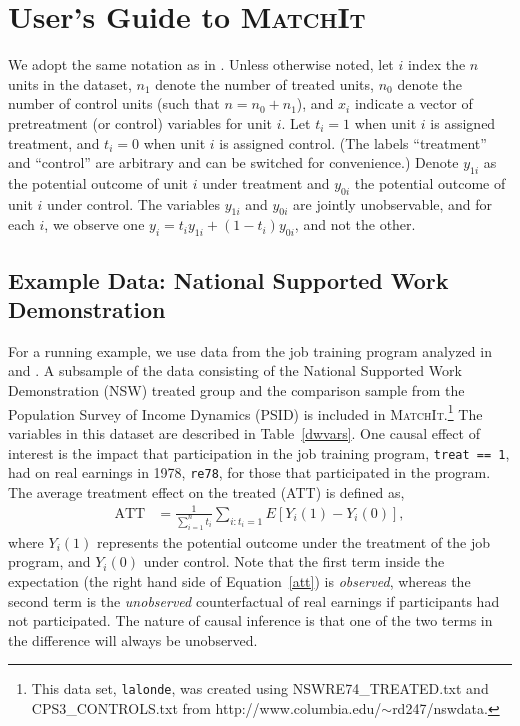 \documentclass[oneside,letterpaper,titlepage]{article}
\newcommand{\MatchIt}{\textsc{MatchIt}}
\begin{document}
\section{User's Guide to \MatchIt}
\label{methods}

We adopt the same notation as in \citet*{HoImaKin05}. Unless otherwise
noted, let $i$ index the $n$ units in the dataset, $n_1$ denote the
number of treated units, $n_0$ denote the number of control units
(such that $n=n_0+n_1$), and $x_i$ indicate a vector of pretreatment
(or control) variables for unit $i$.  Let $t_i=1$ when unit $i$ is
assigned treatment, and $t_i=0$ when unit $i$ is assigned control.
(The labels ``treatment'' and ``control'' are arbitrary and can be
switched for convenience.)  Denote $y_{1i}$ as the potential outcome
of unit $i$ under treatment and $y_{0i}$ the potential outcome of unit
$i$ under control.  The variables $y_{1i}$ and $y_{0i}$ are jointly
unobservable, and for each $i$, we observe one
$y_i=t_iy_{1i}+(1-t_i)y_{0i}$, and not the other.


\subsection{Example Data: National Supported Work Demonstration}
\label{subsec:lalonde}

For a running example, we use data from the job training program
analyzed in \citet{lalonde86} and \citet{DehWah99}.  A subsample of
the data consisting of the National Supported Work Demonstration (NSW)
treated group and the comparison sample from the Population Survey of
Income Dynamics (PSID) is included in \MatchIt.\footnote{This data set, \texttt{lalonde},
was created using NSWRE74_TREATED.txt and CPS3_CONTROLS.txt from
http://www.columbia.edu/$\sim$rd247/nswdata.}  The variables in this
dataset are described in Table~\ref{dwvars}.  One causal effect of
interest is the impact that participation in the job training program,
\texttt{treat == 1}, had on real earnings in 1978, \texttt{re78}, for
those that participated in the program.  The average treatment effect
on the treated (ATT) is defined as,
\begin{align}
  \label{att}
  \text{ATT} & = \frac{1}{\sum_{i=1}^n t_i}\sum_{i:t_i=1} E[Y_i(1) - Y_i(0)],
\end{align}
where $Y_i(1)$ represents the potential outcome under the treatment of
the job program, and $Y_i(0)$ under control.  Note that the first term
inside the expectation (the right hand side of Equation~\ref{att}) is
\emph{observed}, whereas the second term is the \emph{unobserved}
counterfactual of real earnings if participants had not participated.
The nature of causal inference is that one of the two terms in the
difference will always be unobserved.  
\end{document}
